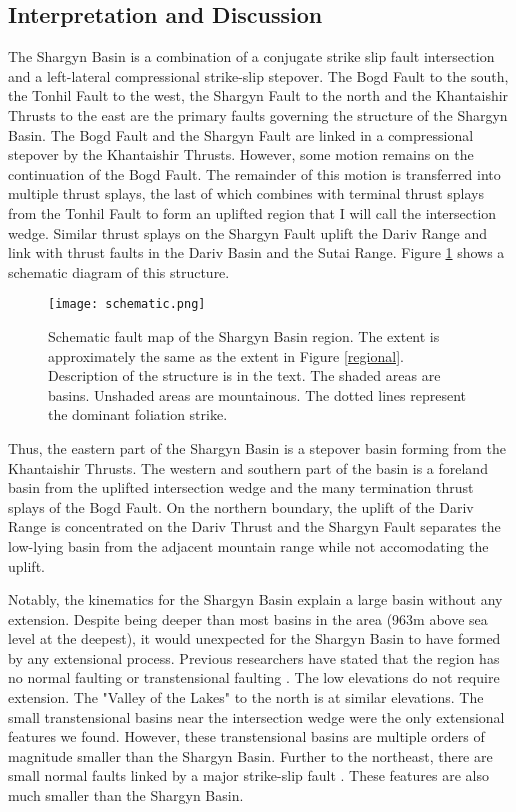 \subsection{Interpretation and Discussion}
	The Shargyn Basin is a combination of a conjugate strike slip fault intersection and a left-lateral compressional strike-slip stepover. The Bogd Fault to the south, the Tonhil Fault to the west, the Shargyn Fault to the north and the Khantaishir Thrusts to the east are the primary faults governing the structure of the Shargyn Basin. The Bogd Fault and the Shargyn Fault are linked in a compressional stepover by the Khantaishir Thrusts. However, some motion remains on the continuation of the Bogd Fault. The remainder of this motion is transferred into multiple thrust splays, the last of which combines with terminal thrust splays from the Tonhil Fault to form an uplifted region that I will call the intersection wedge. Similar thrust splays on the Shargyn Fault uplift the Dariv Range and link with thrust faults in the Dariv Basin and the Sutai Range. Figure \ref{schematic} shows a schematic diagram of this structure.

\begin{figure}[h!]
  \centering
  \texttt{[image: schematic.png]}
  \caption{Schematic fault map of the Shargyn Basin region. The extent is approximately the same as the extent in Figure \ref{regional}. Description of the structure is in the text. The shaded areas are basins. Unshaded areas are mountainous. The dotted lines represent the dominant foliation strike. }
  \label{schematic}
\end{figure}

	Thus, the eastern part of the Shargyn Basin is a stepover basin forming from the Khantaishir Thrusts. The western and southern part of the basin is a foreland basin from the uplifted intersection wedge and the many termination thrust splays of the Bogd Fault. On the northern boundary, the uplift of the Dariv Range is concentrated on the Dariv Thrust and the Shargyn Fault separates the low-lying basin from the adjacent mountain range while not accomodating the uplift.

	Notably, the kinematics for the Shargyn Basin explain a large basin without any extension. Despite being deeper than most basins in the area (963m above sea level at the deepest), it would unexpected for the Shargyn Basin to have formed by any extensional process. Previous researchers have stated that the region has no normal faulting or transtensional faulting \citep{Cunningham2005a}. The low elevations do not require extension. The "Valley of the Lakes" to the north is at similar elevations. The small transtensional basins near the intersection wedge were the only extensional features we found. However, these transtensional basins are multiple orders of magnitude smaller than the Shargyn Basin. Further to the northeast, there are small normal faults linked by a major strike-slip fault \citep{Walker2006}. These features are also much smaller than the Shargyn Basin.

